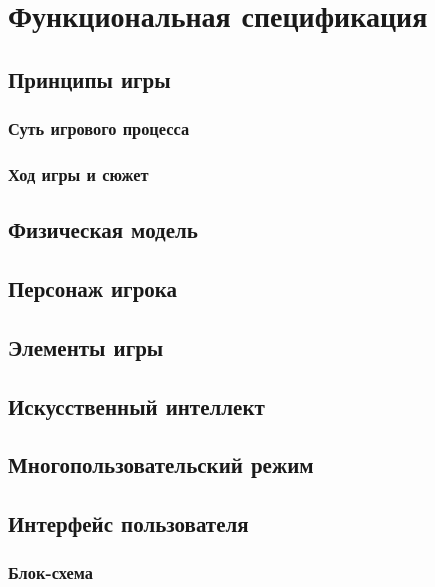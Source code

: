\documentclass{article}
\begin{document}
\newpage
\section{Функциональная спецификация}
\subsection{Принципы игры}
\subsubsection{Суть игрового процесса}

\subsubsection{Ход игры и сюжет}

\subsection{Физическая модель}

\subsection{Персонаж игрока}

\subsection{Элементы игры}

\subsection{Искусственный интеллект}

\subsection{Многопользовательский режим}

\subsection{Интерфейс пользователя}
\subsubsection{Блок-схема}
\end{document}
